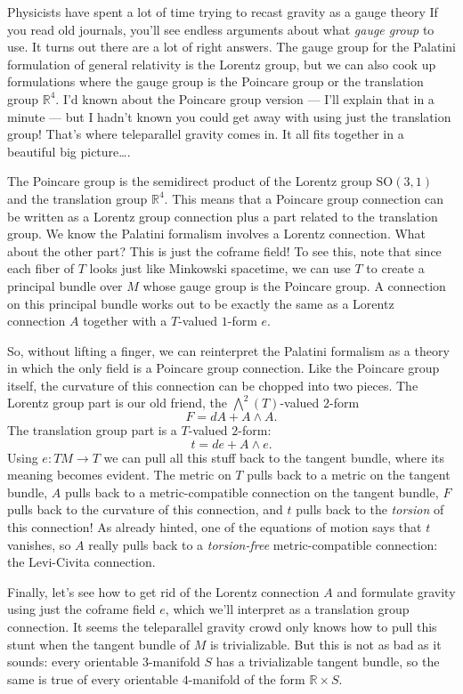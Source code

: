 \documentclass{article}
\begin{document}
Physicists have spent a lot of time trying to recast gravity as a gauge
theory If you read old journals, you'll see endless arguments about what
\emph{gauge group} to use. It turns out there are a lot of right
answers. The gauge group for the Palatini formulation of general
relativity is the Lorentz group, but we can also cook up formulations
where the gauge group is the Poincare group or the translation group
\(\mathbb{R}^4\). I'd known about the Poincare group version --- I'll
explain that in a minute --- but I hadn't known you could get away with
using just the translation group! That's where teleparallel gravity
comes in. It all fits together in a beautiful big picture\ldots.

The Poincare group is the semidirect product of the Lorentz group
\(\mathrm{SO}(3,1)\) and the translation group \(\mathbb{R}^4\). This
means that a Poincare group connection can be written as a Lorentz group
connection plus a part related to the translation group. We know the
Palatini formalism involves a Lorentz connection. What about the other
part? This is just the coframe field! To see this, note that since each
fiber of \(T\) looks just like Minkowski spacetime, we can use \(T\) to
create a principal bundle over \(M\) whose gauge group is the Poincare
group. A connection on this principal bundle works out to be exactly the
same as a Lorentz connection \(A\) together with a \(T\)-valued
\(1\)-form \(e\).

So, without lifting a finger, we can reinterpret the Palatini formalism
as a theory in which the only field is a Poincare group connection. Like
the Poincare group itself, the curvature of this connection can be
chopped into two pieces. The Lorentz group part is our old friend, the
\(\bigwedge^2(T)\)-valued \(2\)-form \[F = dA + A\wedge A.\] The
translation group part is a \(T\)-valued \(2\)-form:
\[t = de + A\wedge e.\] Using \(e\colon TM \to T\) we can pull all this
stuff back to the tangent bundle, where its meaning becomes evident. The
metric on \(T\) pulls back to a metric on the tangent bundle, \(A\)
pulls back to a metric-compatible connection on the tangent bundle,
\(F\) pulls back to the curvature of this connection, and \(t\) pulls
back to the \emph{torsion} of this connection! As already hinted, one of
the equations of motion says that \(t\) vanishes, so \(A\) really pulls
back to a \emph{torsion-free} metric-compatible connection: the
Levi-Civita connection.

Finally, let's see how to get rid of the Lorentz connection \(A\) and
formulate gravity using just the coframe field \(e\), which we'll
interpret as a translation group connection. It seems the teleparallel
gravity crowd only knows how to pull this stunt when the tangent bundle
of \(M\) is trivializable. But this is not as bad as it sounds: every
orientable \(3\)-manifold \(S\) has a trivializable tangent bundle, so
the same is true of every orientable \(4\)-manifold of the form
\(\mathbb{R}\times S\).
\end{document}
